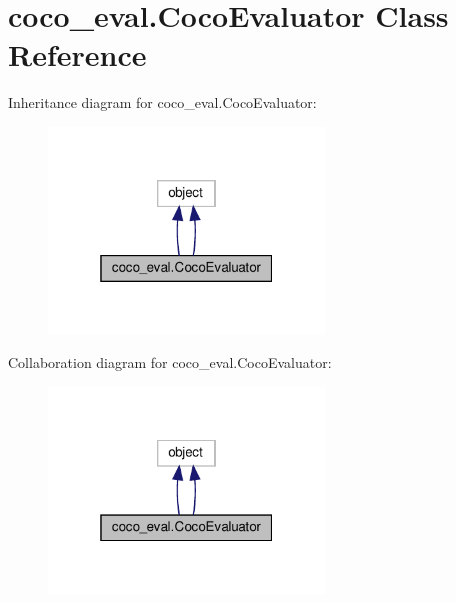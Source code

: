 \hypertarget{classcoco__eval_1_1CocoEvaluator}{}\section{coco\+\_\+eval.\+Coco\+Evaluator Class Reference}
\label{classcoco__eval_1_1CocoEvaluator}


Inheritance diagram for coco\+\_\+eval.\+Coco\+Evaluator\+:
\nopagebreak
\begin{figure}[H]
\begin{center}
\leavevmode
\includegraphics[width=208pt]{classcoco__eval_1_1CocoEvaluator__inherit__graph}
\end{center}
\end{figure}


Collaboration diagram for coco\+\_\+eval.\+Coco\+Evaluator\+:
\nopagebreak
\begin{figure}[H]
\begin{center}
\leavevmode
\includegraphics[width=208pt]{classcoco__eval_1_1CocoEvaluator__coll__graph}
\end{center}
\end{figure}
